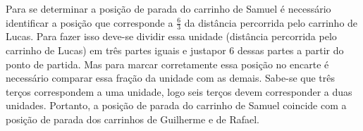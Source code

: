 \documentclass[10 pt,usenames,dvipsnames, oneside]{article}
\begin{document}
\begin{solucao}
\begin{center}
\end{center}


Para se determinar a posição de parada do carrinho de Samuel é necessário identificar a posição que corresponde a $\frac{6}{3}$ da distância percorrida pelo carrinho de Lucas. Para fazer isso deve-se dividir essa unidade (distância percorrida pelo carrinho de Lucas) em três partes iguais e justapor 6 dessas partes a partir do ponto de partida. Mas para marcar corretamente essa posição no encarte é necessário comparar essa fração da unidade com as demais. Sabe-se que três terços correspondem a uma unidade, logo seis terços devem corresponder a duas unidades. Portanto, a posição de parada do carrinho de Samuel coincide com a posição de parada dos carrinhos de Guilherme e de Rafael.

\hspace{-15mm} 

\begin{center}


\end{center}
\end{solucao}
\end{document}
